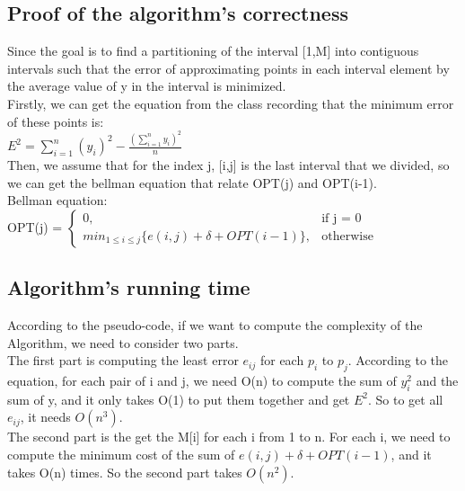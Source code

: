 \documentclass[]{article}
\begin{document}
	\subsection{Proof of the algorithm's correctness}
	
	Since the goal is to find a partitioning of the interval [1,M] into contiguous intervals such that the error of approximating points in each interval element by the average value of y in the interval is minimized. \\ 
	
	\noindent Firstly, we can get the equation from the class recording that the minimum error of these points is: \\ 
	
	$E^{2} = \sum_{i=1}^n (y_{i})^2 - \frac{(\sum_{i=1}^n y_{i})^2}{n}$    \\   
	
	\noindent Then, we assume that for the index j, [i,j] is the last interval that we divided, so we can get the bellman equation that relate OPT(j) and OPT(i-1). \\  
	
	\noindent Bellman equation: \\
	
	OPT(j) =
	$\begin{cases} 
		0,  & \mbox{if }\mbox{j = 0} \\
		min_{1\leq i\leq j} \{e(i,j) + \delta + OPT(i-1)\}, & \mbox{otherwise}
	\end{cases}$ \\
	
	
	\subsection{Algorithm's running time}
	According to the pseudo-code, if we want to compute the complexity of the Algorithm, we need to consider two parts.\\
	
	\noindent The first part is computing the least error $e_{ij}$ for each $p_{i}$ to $p_{j}$. According to the equation, for each pair of i and j, we need O(n) to compute the sum of $y_{i}^{2}$ and the sum of y, and it only takes O(1) to put them together and get $E^{2}$. So to get all $e_{ij}$, it needs $O(n^{3})$. \\
	
	\noindent The second part is the get the M[i] for each i from 1 to n. For each i, we need to compute the minimum cost of the sum of $e(i,j) + \delta + OPT(i-1)$, and it takes O(n) times. So the second part takes $O(n^{2})$.  \\
	
\end{document}
